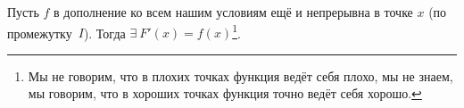 
    	Пусть $f$ в дополнение ко всем нашим условиям ещё и непрерывна в точке $x$ (по промежутку~$I$).
    	Тогда $\exists\  F'(x)=f(x)$\footnote{Мы не говорим, что в плохих точках функция ведёт себя плохо, мы не знаем, мы говорим,
    	что в хороших точках функция точно ведёт себя хорошо.}.
    